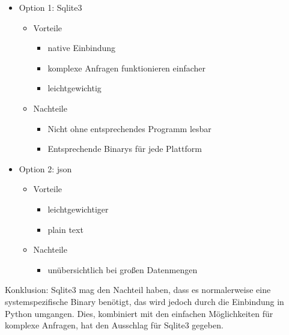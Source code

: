 \begin{itemize}
    \item Option 1: Sqlite3
    \begin{itemize}
        \item Vorteile
        \begin{itemize}
            \item native Einbindung
            \item komplexe Anfragen funktionieren einfacher
            \item leichtgewichtig
        \end{itemize}
        \item Nachteile
                
        \begin{itemize}
            \item Nicht ohne entsprechendes Programm lesbar
            \item Entsprechende Binarys für jede Plattform
        \end{itemize}
    \end{itemize}
     \item Option 2: json  
    \begin{itemize}
        \item Vorteile
        \begin{itemize}
            \item leichtgewichtiger
            \item plain text
        \end{itemize}
        \item Nachteile
        \begin{itemize}
            \item unübersichtlich bei großen Datenmengen
        \end{itemize}        
    \end{itemize}
\end{itemize}

Konklusion: Sqlite3 mag den Nachteil haben, dass es normalerweise eine systemspezifische
Binary benötigt, das wird jedoch durch die Einbindung in Python umgangen. Dies, kombiniert
mit den einfachen Möglichkeiten für komplexe Anfragen, hat den Ausschlag für Sqlite3
gegeben.

    